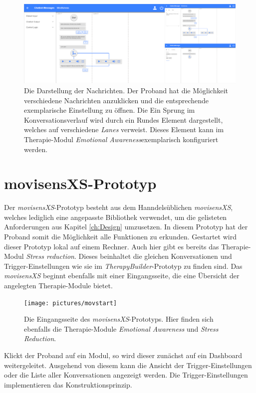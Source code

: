 \begin{figure}[h]
\centering
\includegraphics[width=1\textwidth]{pictures/textset}
\caption{Die Darstellung der Nachrichten. Der Proband hat die Möglichkeit verschiedene Nachrichten anzuklicken und die entsprechende exemplarische Einstellung zu öffnen. Die Ein Sprung im Konversationsverlauf wird durch ein Rundes Element dargestellt, welches auf verschiedene \emph{Lanes} verweist. Dieses Element kann im Therapie-Modul \emph{Emotional Awareness}exemplarisch konfiguriert werden.} 
\label{textset}
\end{figure}

\section{movisensXS-Prototyp}
Der \emph{movisensXS}-Prototyp besteht aus dem Hanndelsüblichen \emph{movisensXS}, welches lediglich eine angepasste Bibliothek verwendet, um die gelisteten Anforderungen aus Kapitel \ref{ch:Design} umzusetzen. In diesem Prototyp hat der Proband somit die Möglichkeit alle Funktionen zu erkunden. Gestartet wird dieser Prototyp lokal auf einem Rechner. Auch hier gibt es bereits das Therapie-Modul \emph{Stress reduction}. Dieses beinhaltet die gleichen Konversationen und Trigger-Einstellungen wie sie im \emph{TherapyBuilder}-Prototyp zu finden sind. Das \emph{movisensXS} beginnt ebenfalls mit einer Eingangsseite, die eine Übersicht der angelegten Therapie-Module bietet. 

\begin{figure}[h]
\centering
\texttt{[image: pictures/movstart]}
\caption{Die Eingangsseite des \emph{movisensXS}-Prototyps. Hier finden sich ebenfalls die Therapie-Module \emph{Emotional Awareness} und \emph{Stress Reduction}.}
\label{start}
\end{figure}

Klickt der Proband auf ein Modul, so wird dieser zunächst auf ein Dashboard weitergeleitet. Ausgehend von diesem kann die Ansicht der Trigger-Einstellungen oder die Liste aller Konversationen angezeigt werden. Die Trigger-Einstellungen implementieren das Konstruktionsprinzip.

